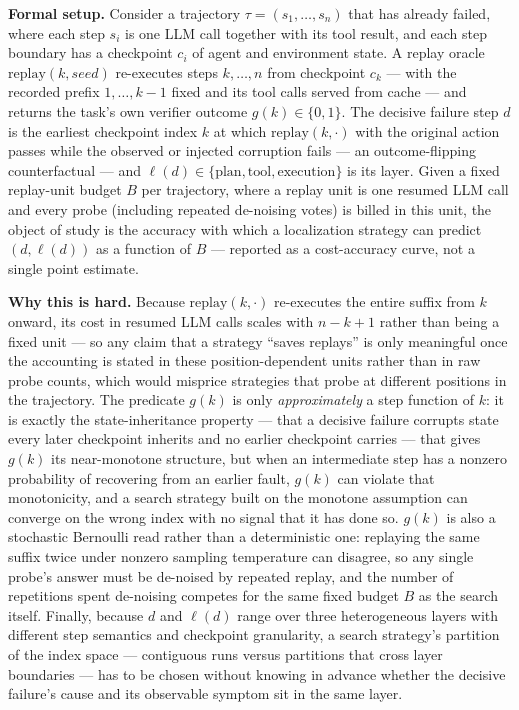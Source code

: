 \documentclass[11pt]{article}
\begin{document}
\noindent\textbf{Formal setup.} Consider a trajectory $\tau = (s_1,\dots,s_n)$ that has already failed, where each step $s_i$ is one LLM call together with its tool result, and each step boundary has a checkpoint $c_i$ of agent and environment state. A replay oracle $\mathrm{replay}(k,\mathit{seed})$ re-executes steps $k,\dots,n$ from checkpoint $c_k$ --- with the recorded prefix $1,\dots,k-1$ fixed and its tool calls served from cache --- and returns the task's own verifier outcome $g(k) \in \{0,1\}$. The decisive failure step $d$ is the earliest checkpoint index $k$ at which $\mathrm{replay}(k,\cdot)$ with the original action passes while the observed or injected corruption fails --- an outcome-flipping counterfactual --- and $\ell(d) \in \{\text{plan}, \text{tool}, \text{execution}\}$ is its layer. Given a fixed replay-unit budget $B$ per trajectory, where a replay unit is one resumed LLM call and every probe (including repeated de-noising votes) is billed in this unit, the object of study is the accuracy with which a localization strategy can predict $(d,\ell(d))$ as a function of $B$ --- reported as a cost-accuracy curve, not a single point estimate.

\noindent\textbf{Why this is hard.} Because $\mathrm{replay}(k,\cdot)$ re-executes the entire suffix from $k$ onward, its cost in resumed LLM calls scales with $n-k+1$ rather than being a fixed unit --- so any claim that a strategy ``saves replays'' is only meaningful once the accounting is stated in these position-dependent units rather than in raw probe counts, which would misprice strategies that probe at different positions in the trajectory. The predicate $g(k)$ is only \emph{approximately} a step function of $k$: it is exactly the state-inheritance property --- that a decisive failure corrupts state every later checkpoint inherits and no earlier checkpoint carries --- that gives $g(k)$ its near-monotone structure, but when an intermediate step has a nonzero probability of recovering from an earlier fault, $g(k)$ can violate that monotonicity, and a search strategy built on the monotone assumption can converge on the wrong index with no signal that it has done so. $g(k)$ is also a stochastic Bernoulli read rather than a deterministic one: replaying the same suffix twice under nonzero sampling temperature can disagree, so any single probe's answer must be de-noised by repeated replay, and the number of repetitions spent de-noising competes for the same fixed budget $B$ as the search itself. Finally, because $d$ and $\ell(d)$ range over three heterogeneous layers with different step semantics and checkpoint granularity, a search strategy's partition of the index space --- contiguous runs versus partitions that cross layer boundaries --- has to be chosen without knowing in advance whether the decisive failure's cause and its observable symptom sit in the same layer.
\end{document}
